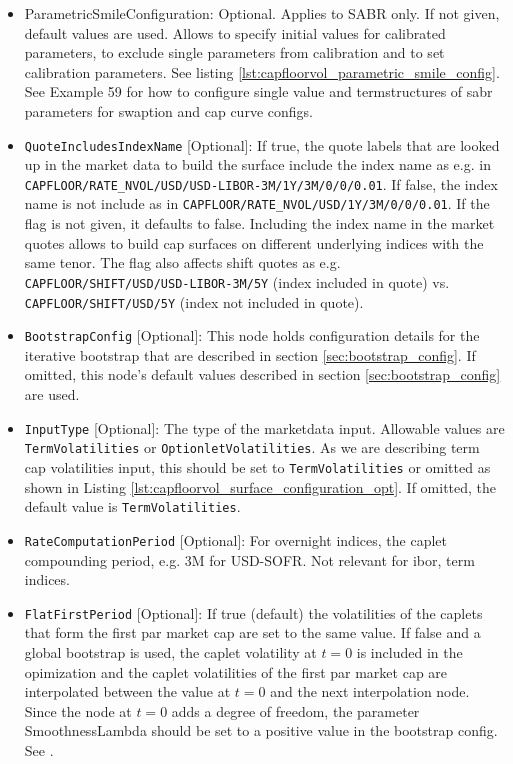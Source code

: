 \begin{itemize}
\item ParametricSmileConfiguration: Optional. Applies to SABR only. If not given, default values are used. Allows to specify initial values
  for calibrated parameters, to exclude single parameters from calibration and to set calibration parameters. See
  listing \ref{lst:capfloorvol_parametric_smile_config}. See Example 59 for how to configure single value and
  termstructures of sabr parameters for swaption and cap curve configs.

\item \lstinline!QuoteIncludesIndexName! [Optional]:
If true, the quote labels that are looked up in the market data to build the surface include the index name as e.g. in \lstinline!CAPFLOOR/RATE_NVOL/USD/USD-LIBOR-3M/1Y/3M/0/0/0.01!. If false, the index name is not include as in \lstinline!CAPFLOOR/RATE_NVOL/USD/1Y/3M/0/0/0.01!. If the flag is not given, it defaults to false. Including the index name in the market quotes allows to build cap surfaces on different underlying indices with the same tenor. The flag also affects shift quotes as e.g. \lstinline!CAPFLOOR/SHIFT/USD/USD-LIBOR-3M/5Y! (index included in quote) vs. \lstinline!CAPFLOOR/SHIFT/USD/5Y! (index not included in quote).

\item \lstinline!BootstrapConfig! [Optional]:
This node holds configuration details for the iterative bootstrap that are described in section \ref{sec:bootstrap_config}. If omitted, this node's default values described in section \ref{sec:bootstrap_config} are used.

\item \lstinline!InputType! [Optional]:
The type of the marketdata input. Allowable values are \lstinline!TermVolatilities! or \lstinline!OptionletVolatilities!. As we are describing term cap volatilities input, this should be set to \lstinline!TermVolatilities! or omitted as shown in Listing \ref{lst:capfloorvol_surface_configuration_opt}. If omitted, the default value is \lstinline!TermVolatilities!.

\item \lstinline!RateComputationPeriod! [Optional]:
For overnight indices, the caplet compounding period, e.g. 3M for USD-SOFR. Not relevant for ibor, term indices.

\item \lstinline!FlatFirstPeriod! [Optional]:
If true (default) the volatilities of the caplets that form the first par market cap are set to the same value. If false
and a global bootstrap is used, the caplet volatility at $t=0$ is included in the opimization and the caplet
volatilities of the first par market cap are interpolated between the value at $t=0$ and the next interpolation
node. Since the node at $t=0$ adds a degree of freedom, the parameter SmoothnessLambda should be set to a positive value
in the bootstrap config. See \label{sec:bootstrap_config}.


\end{itemize}
